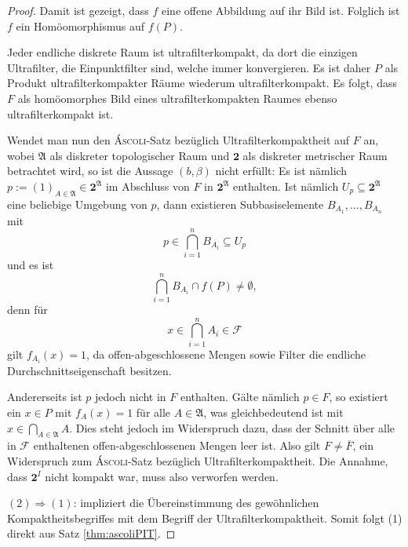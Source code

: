 \begin{proof}
  Damit ist gezeigt, dass $f$ eine offene Abbildung auf ihr Bild ist.
  Folglich ist $f$ ein Homöomorphismus auf $f(P)$.

  Jeder endliche diskrete Raum ist ultrafilterkompakt, da dort die einzigen Ultrafilter, die Einpunktfilter sind, welche immer konvergieren.
  Es ist daher $P$ als Produkt ultrafilterkompakter Räume wiederum ultrafilterkompakt.
  Es folgt, dass $F$ als homöomorphes Bild eines ultrafilterkompakten Raumes ebenso ultrafilterkompakt ist.

  Wendet man nun den \textsc{Áscoli}-Satz bezüglich Ultrafilterkompaktheit auf $F$ an, wobei $\mathfrak{A}$ als diskreter topologischer Raum und $\mathbf{2}$ als diskreter metrischer Raum betrachtet wird, so ist die Aussage $(b, \beta)$ nicht erfüllt:
  Es ist nämlich $p := (1)_{A \in \mathfrak{A}} \in \mathbf{2}^\mathfrak{A}$ im Abschluss von $F$ in $\mathbf{2}^\mathfrak{A}$ enthalten.
  Ist nämlich $U_p \subseteq \mathbf{2}^\mathfrak{A}$ eine beliebige Umgebung von $p$, dann existieren Subbasiselemente $B_{A_1},\dots,B_{A_n}$ mit
  \begin{displaymath}
    p \in \bigcap_{i=1}^n B_{A_i} \subseteq U_p
  \end{displaymath}
  und es ist
  \begin{displaymath}
    \bigcap_{i=1}^n B_{A_i} \cap f(P) \neq \emptyset,
  \end{displaymath}
  denn für 
  \begin{displaymath}
    x \in \bigcap_{i=1}^n A_i \in \mathcal{F}
  \end{displaymath}
  gilt $f_{A_i}(x) = 1$, da offen-abgeschlossene Mengen sowie Filter die endliche Durchschnittseigenschaft besitzen.
  
  Andererseits ist $p$ jedoch nicht in $F$ enthalten. 
  Gälte nämlich $p \in F$, so existiert ein $x \in P$ mit $f_A(x) = 1$ für alle $A \in \mathfrak{A}$, was gleichbedeutend ist mit $x \in \bigcap_{A \in \mathfrak{A}} A$.
  Dies steht jedoch im Widerspruch dazu, dass der Schnitt über alle in $\mathcal{F}$ enthaltenen offen-abgeschlossenen Mengen leer ist.
  Also gilt $F \neq \overline{F}$, ein Widerspruch zum \textsc{Áscoli}-Satz bezüglich Ultrafilterkompaktheit.
  Die Annahme, dass $\mathbf{2}^I$ nicht kompakt war, muss also verworfen werden.

  $(2)\Rightarrow(1)$: \PIT impliziert die Übereinstimmung des gewöhnlichen Kompaktheitsbegriffes mit dem Begriff der Ultrafilterkompaktheit. Somit folgt (1) direkt aus Satz \ref{thm:ascoliPIT}.
\end{proof}

